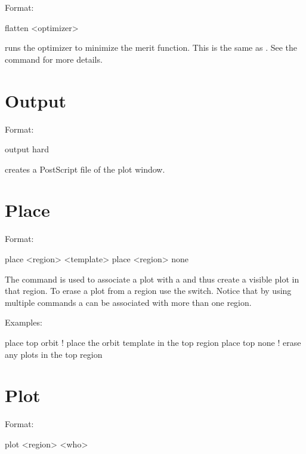 Format:
\begin{example}
  flatten <optimizer>
\end{example}

\vskip 0.2in
 runs the optimizer to minimize the merit function. This is the 
same as . See the  command for more details.

\section{Output}
\label{s:output}

Format:
\begin{example}
  output hard
\end{example}

\vskip 0.2in
 creates a PostScript file of the plot window. 

\section{Place}
\label{s:place}

Format:
\begin{example}
  place <region> <template>
  place <region> none
\end{example}

\vskip 0.2in The  command is used to associate a
 plot with a  and thus create a visible
plot in that region. To erase a plot from a region use the 
switch. Notice that by using multiple  commands a
 can be associated with more than one region. 

Examples:
\begin{example}
  place top orbit  ! place the orbit template in the top region
  place top none   ! erase any plots in the top region
\end{example}

\section{Plot}
\label{s:plot}

Format:
\begin{example}
  plot <region> <who>
\end{example}

